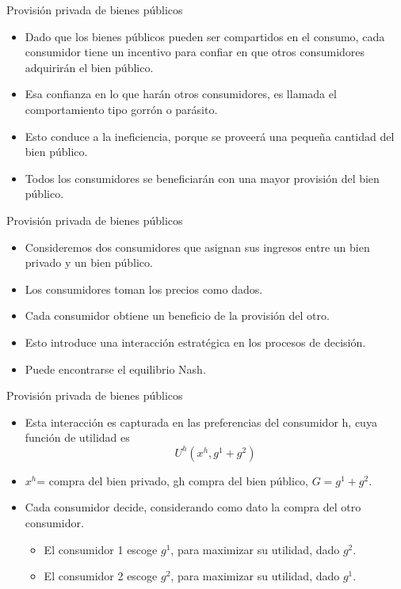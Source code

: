 \begin{frame}{Provisión privada de bienes públicos}
	\begin{itemize}
		\item Dado que los bienes públicos pueden ser compartidos en el consumo, cada consumidor tiene un incentivo para confiar en que otros consumidores adquirirán el bien público. 
		\item Esa confianza en lo que harán otros consumidores, es llamada el  comportamiento tipo gorrón o parásito.
		\item Esto conduce a la ineficiencia, porque se proveerá una pequeña cantidad del bien público.
		\item Todos los consumidores se beneficiarán con una  mayor  provisión del bien público.
	\end{itemize}
\end{frame}
\begin{frame}{Provisión privada de bienes públicos}
	\begin{itemize}
		\item Consideremos dos consumidores que asignan sus ingresos entre un bien privado y un bien público.
		\item Los consumidores toman los precios como dados. 
		\item Cada consumidor obtiene un beneficio de la provisión del otro.
		\item Esto introduce una interacción estratégica en los procesos de decisión.
		\item Puede encontrarse el equilibrio Nash.
	\end{itemize}
\end{frame}
\begin{frame}{Provisión privada de bienes públicos}
	\begin{itemize}
		\item Esta interacción es capturada en las preferencias del consumidor  h, cuya función de utilidad es
				$$U^h(x^h, g^1 + g^2)$$
		\item $x^h$= compra del bien privado, gh compra del bien público, $G=g^1+g^2$.
		\item Cada consumidor decide, considerando como dato la compra del otro consumidor.
			\begin{itemize}
				\item El consumidor 1 escoge $g^1$, para maximizar su utilidad, dado $g^2$. 
				\item El consumidor 2 escoge $g^2$, para maximizar su utilidad, dado $g^1$. 
			\end{itemize}
	\end{itemize}
\end{frame}

